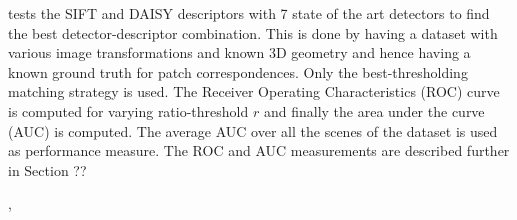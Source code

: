 \documentclass[../thesis.tex]{subfiles}
\begin{document}
\cite{dahl2011finding} tests the SIFT and DAISY descriptors with 7 state of the art detectors to find the best detector-descriptor combination. This is done by having a dataset with various image transformations and known 3D geometry and hence having a known ground truth for patch correspondences. Only the best-thresholding matching strategy is used. The Receiver Operating Characteristics (ROC) curve is computed for varying ratio-threshold $r$ and finally the area under the curve (AUC) is computed. The average AUC over all the scenes of the dataset is used as performance measure. The ROC and AUC measurements are described further in Section ??

\cite{mikolajczyk2005performance},
\cite{dahl2011finding}

\subbibliography
\end{document}
